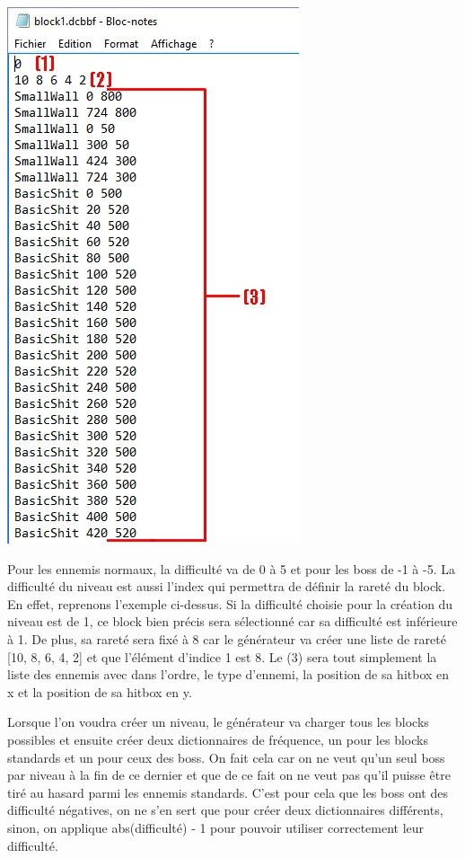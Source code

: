 \documentclass{article}
\begin{document}
\begin{center}
\includegraphics[scale=0.75]{images/explaindcbbf.jpg}
\end{center}

Pour les ennemis normaux, la difficulté va de 0 à 5 et pour les boss de -1 à -5. La difficulté du niveau est aussi l'index qui permettra de définir la rareté du block. En effet, reprenons l'exemple ci-dessus. Si la difficulté choisie pour la création du niveau est de 1, ce block bien précis sera sélectionné car sa difficulté est inférieure à 1. De plus, sa rareté sera fixé à 8 car le générateur va créer une liste de rareté [10, 8, 6, 4, 2] et que l'élément d'indice 1 est 8. Le (3) sera tout simplement la liste des ennemis avec dans l'ordre, le type d'ennemi, la position de sa hitbox en x et la position de sa hitbox en y.

Lorsque l'on voudra créer un niveau, le générateur va charger tous les blocks possibles et ensuite créer deux dictionnaires de fréquence, un pour les blocks standards et un pour ceux des boss. On fait cela car on ne veut qu'un seul boss par niveau à la fin de ce dernier et que de ce fait on ne veut pas qu'il puisse être tiré au hasard parmi les ennemis standards. C'est pour cela que les boss ont des difficulté négatives, on ne s'en sert que pour créer deux dictionnaires différents, sinon, on applique abs(difficulté) - 1 pour pouvoir utiliser correctement leur difficulté.
 
\end{document}
